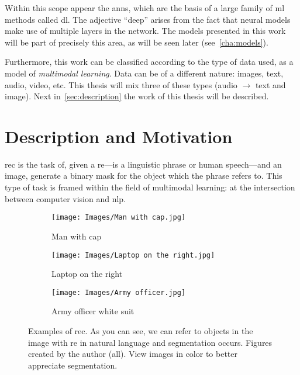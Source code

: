 Within this scope appear the \glspl{ann}, which are the basis of a large family
of \gls{ml} methods called \gls{dl}. The adjective
``deep'' arises from the fact that neural models make use of multiple layers in
the network. The models presented in this work will be part of precisely this
area, as will be seen later (see\ \vref{cha:models}).

Furthermore, this work can be classified according to the type of data used, as
a model of \emph{multimodal learning}. Data can be
of a different nature: images, text, audio, video, etc. This thesis will mix
three of these types (audio \(\rightarrow\) text and image). Next in\
\vref{sec:description} the work of this thesis will be described.



\section{Description and Motivation}\label{sec:description}

\gls{rec} is the task of, given a \gls{re}---is a linguistic phrase or human
speech---and an image, generate a binary mask for the object which the phrase
refers to. This type of task is framed within the field of multimodal learning:
at the intersection between computer vision and \gls{nlp}.

\begin{figure}[ht]
  \centering
  \begin{subfigure}[t]{.32\textwidth}
    \centering
    \caption{Man with cap}
    \texttt{[image: Images/Man with cap.jpg]}
  \end{subfigure}\hfill
  \begin{subfigure}[t]{.32\textwidth}
    \centering
    \caption{Laptop on the right}
    \texttt{[image: Images/Laptop on the right.jpg]}
  \end{subfigure}\hfill
  \begin{subfigure}[t]{.32\textwidth}
    \centering
    \caption{Army officer white suit}
    \texttt{[image: Images/Army officer.jpg]}
  \end{subfigure}
  \caption[Examples of ]{Examples of \acl{rec}. As you can
    see, we can refer to objects in the image with \gls{re} in natural language
    and segmentation occurs. Figures created by the author (all). View images
    in color to better appreciate segmentation.}%
  \label{fig:demo}
\end{figure}

